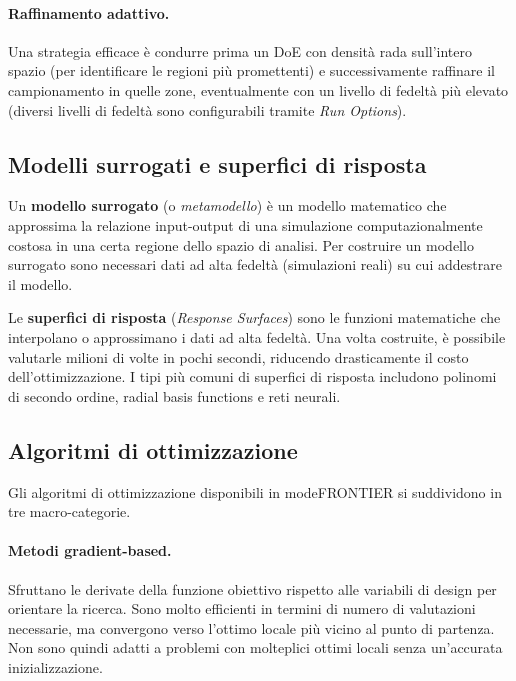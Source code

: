 \paragraph{Raffinamento adattivo.}
Una strategia efficace è condurre prima un DoE con densità rada sull'intero
spazio (per identificare le regioni più promettenti) e successivamente
raffinare il campionamento in quelle zone, eventualmente con un livello
di fedeltà più elevato (diversi livelli di fedeltà sono configurabili
tramite \textit{Run Options}).

\subsection{Modelli surrogati e superfici di risposta}
\label{sec:surrogate}

Un \textbf{modello surrogato} (o \textit{metamodello}) è un modello
matematico che approssima la relazione input-output di una simulazione
computazionalmente costosa in una certa regione dello spazio di analisi.
Per costruire un modello surrogato sono necessari dati ad alta fedeltà
(simulazioni reali) su cui addestrare il modello.

Le \textbf{superfici di risposta} (\textit{Response Surfaces}) sono le
funzioni matematiche che interpolano o approssimano i dati ad alta
fedeltà.
Una volta costruite, è possibile valutarle milioni di volte in pochi
secondi, riducendo drasticamente il costo dell'ottimizzazione.
I tipi più comuni di superfici di risposta includono polinomi di
secondo ordine, radial basis functions e reti neurali.

\subsection{Algoritmi di ottimizzazione}

Gli algoritmi di ottimizzazione disponibili in modeFRONTIER si
suddividono in tre macro-categorie.

\paragraph{Metodi gradient-based.}
Sfruttano le derivate della funzione obiettivo rispetto alle variabili
di design per orientare la ricerca.
Sono molto efficienti in termini di numero di valutazioni necessarie,
ma convergono verso l'ottimo locale più vicino al punto di partenza.
Non sono quindi adatti a problemi con molteplici ottimi locali senza
un'accurata inizializzazione.

